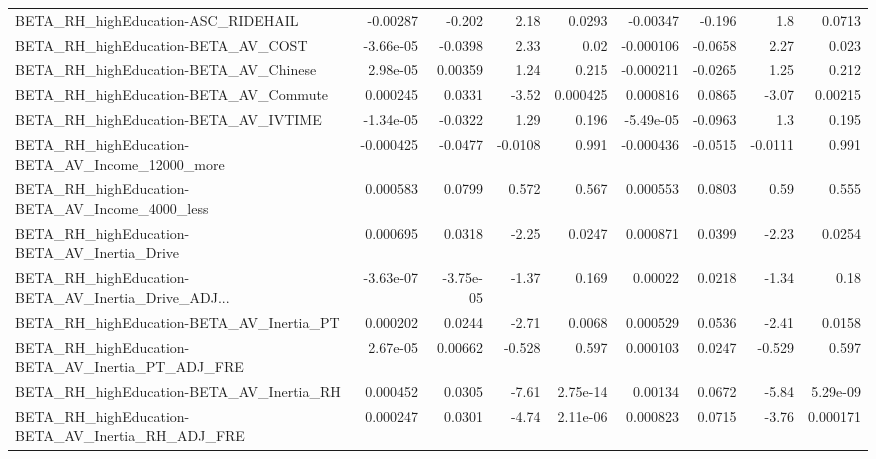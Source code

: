 \begin{tabular}{lrrrrrrrr}
BETA\_RH\_highEducation-ASC\_RIDEHAIL                 &    -0.00287 &       -0.202 &     2.18 &   0.0293 &   -0.00347 &      -0.196 &          1.8 &        0.0713 \\
BETA\_RH\_highEducation-BETA\_AV\_COST                 &   -3.66e-05 &      -0.0398 &     2.33 &     0.02 &  -0.000106 &     -0.0658 &         2.27 &         0.023 \\
BETA\_RH\_highEducation-BETA\_AV\_Chinese              &    2.98e-05 &      0.00359 &     1.24 &    0.215 &  -0.000211 &     -0.0265 &         1.25 &         0.212 \\
BETA\_RH\_highEducation-BETA\_AV\_Commute              &    0.000245 &       0.0331 &    -3.52 & 0.000425 &   0.000816 &      0.0865 &        -3.07 &       0.00215 \\
BETA\_RH\_highEducation-BETA\_AV\_IVTIME               &   -1.34e-05 &      -0.0322 &     1.29 &    0.196 &  -5.49e-05 &     -0.0963 &          1.3 &         0.195 \\
BETA\_RH\_highEducation-BETA\_AV\_Income\_12000\_more    &   -0.000425 &      -0.0477 &  -0.0108 &    0.991 &  -0.000436 &     -0.0515 &      -0.0111 &         0.991 \\
BETA\_RH\_highEducation-BETA\_AV\_Income\_4000\_less     &    0.000583 &       0.0799 &    0.572 &    0.567 &   0.000553 &      0.0803 &         0.59 &         0.555 \\
BETA\_RH\_highEducation-BETA\_AV\_Inertia\_Drive        &    0.000695 &       0.0318 &    -2.25 &   0.0247 &   0.000871 &      0.0399 &        -2.23 &        0.0254 \\
BETA\_RH\_highEducation-BETA\_AV\_Inertia\_Drive\_ADJ... &   -3.63e-07 &    -3.75e-05 &    -1.37 &    0.169 &    0.00022 &      0.0218 &        -1.34 &          0.18 \\
BETA\_RH\_highEducation-BETA\_AV\_Inertia\_PT           &    0.000202 &       0.0244 &    -2.71 &   0.0068 &   0.000529 &      0.0536 &        -2.41 &        0.0158 \\
BETA\_RH\_highEducation-BETA\_AV\_Inertia\_PT\_ADJ\_FRE   &    2.67e-05 &      0.00662 &   -0.528 &    0.597 &   0.000103 &      0.0247 &       -0.529 &         0.597 \\
BETA\_RH\_highEducation-BETA\_AV\_Inertia\_RH           &    0.000452 &       0.0305 &    -7.61 & 2.75e-14 &    0.00134 &      0.0672 &        -5.84 &      5.29e-09 \\
BETA\_RH\_highEducation-BETA\_AV\_Inertia\_RH\_ADJ\_FRE   &    0.000247 &       0.0301 &    -4.74 & 2.11e-06 &   0.000823 &      0.0715 &        -3.76 &      0.000171 \\

\end{tabular}
